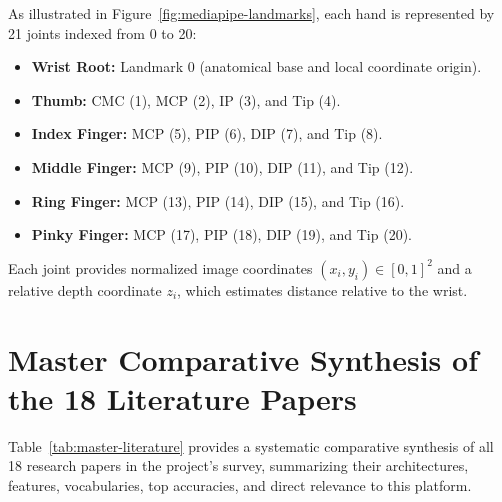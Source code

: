 As illustrated in Figure~\ref{fig:mediapipe-landmarks}, each hand is represented by 21 joints indexed from 0 to 20:
\begin{itemize}
\item \textbf{Wrist Root:} Landmark 0 (anatomical base and local coordinate origin).
\item \textbf{Thumb:} CMC (1), MCP (2), IP (3), and Tip (4).
\item \textbf{Index Finger:} MCP (5), PIP (6), DIP (7), and Tip (8).
\item \textbf{Middle Finger:} MCP (9), PIP (10), DIP (11), and Tip (12).
\item \textbf{Ring Finger:} MCP (13), PIP (14), DIP (15), and Tip (16).
\item \textbf{Pinky Finger:} MCP (17), PIP (18), DIP (19), and Tip (20).
\end{itemize}
Each joint provides normalized image coordinates $(x_{i}, y_{i}) \in [0, 1]^2$ and a relative depth coordinate $z_{i}$, which estimates distance relative to the wrist.

\section{Master Comparative Synthesis of the 18 Literature Papers}
Table~\ref{tab:master-literature} provides a systematic comparative synthesis of all 18 research papers in the project's survey, summarizing their architectures, features, vocabularies, top accuracies, and direct relevance to this platform.

